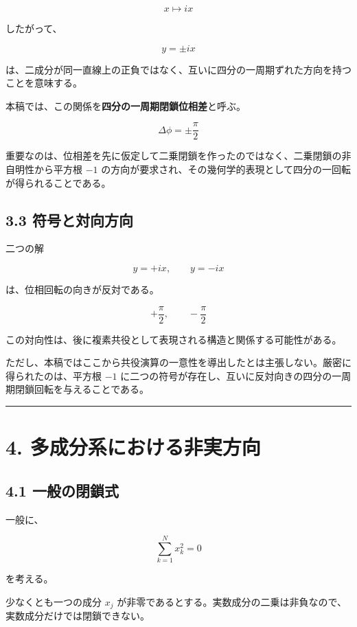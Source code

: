 \documentclass[
  a4paper,
  10pt]{article}
\begin{document}
\[
x\longmapsto ix
\]

したがって、

\[
y=\pm ix
\]

は、二成分が同一直線上の正負ではなく、互いに四分の一周期ずれた方向を持つことを意味する。

本稿では、この関係を\textbf{四分の一周期閉鎖位相差}と呼ぶ。

\[
\Delta\phi=\pm\frac{\pi}{2}
\]

重要なのは、位相差を先に仮定して二乗閉鎖を作ったのではなく、二乗閉鎖の非自明性から平方根
\(-1\)
の方向が要求され、その幾何学的表現として四分の一回転が得られることである。

\subsection{3.3
符号と対向方向}\label{33-ux7b26ux53f7ux3068ux5bfeux5411ux65b9ux5411}

二つの解

\[
y=+ix,
\qquad
y=-ix
\]

は、位相回転の向きが反対である。

\[
+\frac{\pi}{2},
\qquad
-\frac{\pi}{2}
\]

この対向性は、後に複素共役として表現される構造と関係する可能性がある。

ただし、本稿ではここから共役演算の一意性を導出したとは主張しない。厳密に得られたのは、平方根
\(-1\)
に二つの符号が存在し、互いに反対向きの四分の一周期閉鎖回転を与えることである。

\begin{center}\rule{0.5\linewidth}{0.5pt}\end{center}

\section{4.
多成分系における非実方向}\label{4-ux591aux6210ux5206ux7cfbux306bux304aux3051ux308bux975eux5b9fux65b9ux5411}

\subsection{4.1
一般の閉鎖式}\label{41-ux4e00ux822cux306eux9589ux9396ux5f0f}

一般に、

\[
\sum_{k=1}^{N}x_k^2=0
\]

を考える。

少なくとも一つの成分 \(x_j\)
が非零であるとする。実数成分の二乗は非負なので、実数成分だけでは閉鎖できない。
\end{document}
